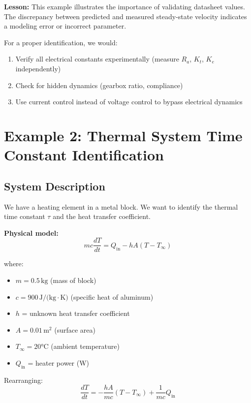 \textbf{Lesson:} This example illustrates the importance of validating datasheet values. The discrepancy between predicted and measured steady-state velocity indicates a modeling error or incorrect parameter.

For a proper identification, we would:
\begin{enumerate}
    \item Verify all electrical constants experimentally (measure $R_a$, $K_t$, $K_e$ independently)
    \item Check for hidden dynamics (gearbox ratio, compliance)
    \item Use current control instead of voltage control to bypass electrical dynamics
\end{enumerate}

\section{Example 2: Thermal System Time Constant Identification}

\subsection{System Description}

We have a heating element in a metal block. We want to identify the thermal time constant $\tau$ and the heat transfer coefficient.

\textbf{Physical model:}
\begin{equation}
mc\frac{dT}{dt} = Q_{\text{in}} - hA(T - T_{\infty})
\end{equation}

where:
\begin{itemize}
    \item $m = 0.5 \, \text{kg}$ (mass of block)
    \item $c = 900 \, \text{J/(kg}\cdot\text{K)}$ (specific heat of aluminum)
    \item $h$ = unknown heat transfer coefficient
    \item $A = 0.01 \, \text{m}^2$ (surface area)
    \item $T_{\infty} = 20°\text{C}$ (ambient temperature)
    \item $Q_{\text{in}}$ = heater power (W)
\end{itemize}

Rearranging:
\begin{equation}
\frac{dT}{dt} = -\frac{hA}{mc}(T - T_{\infty}) + \frac{1}{mc}Q_{\text{in}}
\end{equation}

